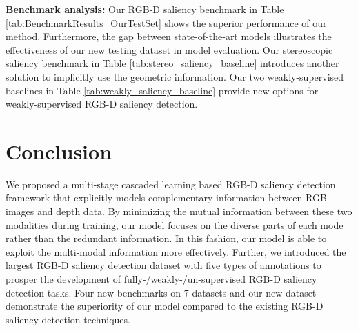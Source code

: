 \documentclass[10pt,twocolumn,letterpaper]{article}
\begin{document}
\noindent\textbf{Benchmark analysis:} Our RGB-D saliency benchmark in Table \ref{tab:BenchmarkResults_OurTestSet} shows the superior performance of our method. Furthermore, the gap between state-of-the-art models illustrates the effectiveness of our new testing dataset in model evaluation. Our stereoscopic saliency benchmark in Table \ref{tab:stereo_saliency_baseline} introduces another solution to implicitly use the geometric information. Our two weakly-supervised baselines in Table \ref{tab:weakly_saliency_baseline} provide new options for weakly-supervised RGB-D saliency detection.







































































\section{Conclusion}
We proposed a multi-stage cascaded learning based RGB-D saliency detection framework that explicitly models complementary information between RGB images and depth data. 
By minimizing the mutual information between these two modalities during training, our model focuses on the diverse parts of each mode rather than the redundant information. 
In this fashion, our model is able to exploit the multi-modal information more effectively.
Further, we introduced the largest RGB-D saliency detection dataset with five types of annotations to prosper the development of fully-/weakly-/un-supervised RGB-D saliency detection tasks.
Four new benchmarks on 7 datasets and our new dataset demonstrate 
the superiority of our model compared to the existing RGB-D saliency detection techniques.








{\small


}
\end{document}
